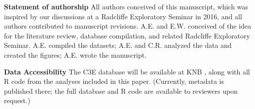 \documentclass{article}
\begin{document}











\date{\today}
\maketitle  %
\tableofcontents      %

\textbf{Statement of authorship} %
All authors conceived of this manuscript, which was inspired by our discussions at a Radcliffe Exploratory Seminar in 2016, and all authors contributed to manuscript revisions. A.E. and E.W. conceived of the idea for the literature review, database compilation, and related Radcliffe Exploratory Seminar. A.E. compiled the datasets; A.E. and C.R. analyzed the data and created the figures; A.E. wrote the manuscript.

\textbf{Data Accessibility} %
The C3E database will be available at KNB \citep{ettinger2017}, along with all R code from the analyses included in this paper. (Currently, metadata is published there; the full database and R code are available to reviewers upon request.)
\end{document}
